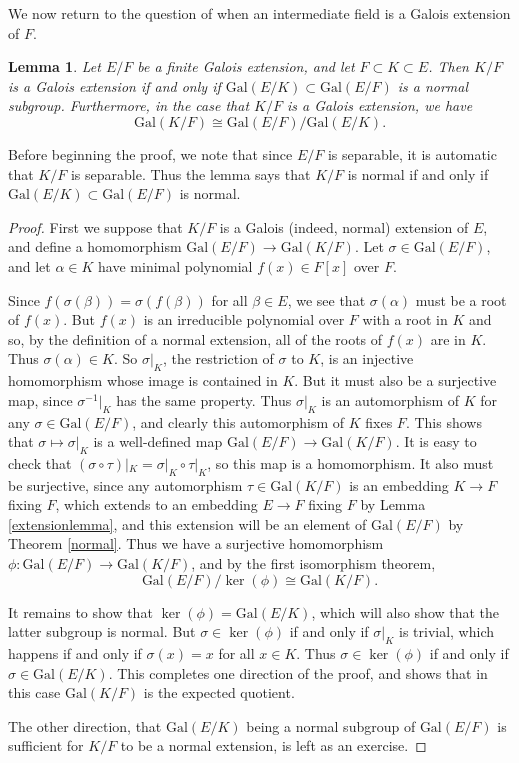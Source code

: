 \documentclass[12pt]{report}
\newtheorem{lemma}[thm]{Lemma}
\theoremstyle{definition}
\def\aa{\alpha}
\def\bb{\beta}
\def\Gal{\text{Gal}}
\begin{document}
We now return to the question of when an intermediate field is a Galois
extension of $F$.

\begin{lemma}
    Let $E/F$ be a finite Galois extension, and let $F \subset  K \subset  E$. Then $K/F$ is a Galois extension if and only if $\Gal(E/K) \subset  \Gal(E/F)$ is a normal subgroup. Furthermore, in the case that $K/F$ is a Galois extension, we have $$\Gal(K/F)\cong \Gal(E/F)/\Gal(E/K).$$
\end{lemma}

Before beginning the proof, we note that since $E/F$ is separable, it is automatic that $K/F$ is separable. Thus the lemma says that $K/F$ is normal if and only if $\Gal(E/K) \subset  \Gal(E/F)$ is normal.

\begin{proof}
    First we suppose that $K/F$ is a Galois (indeed, normal) extension of $E$, and define a homomorphism $\Gal(E/F) \to  \Gal(K/F)$. Let $\sigma\in \Gal(E/F)$, and let $\aa\in K$ have minimal polynomial $f(x)\in F[x]$ over $F$.

    Since $f(\sigma(\bb)) = \sigma(f(\bb))$ for all $\bb\in E$, we see that $\sigma(\aa)$ must be a root of $f(x)$. But $f(x)$ is an irreducible polynomial over $F$ with a root in $K$ and so, by the definition of a normal extension, all of the roots of $f(x)$ are in $K$. Thus $\sigma(\aa)\in K$. So $\sigma|_K$, the restriction of $\sigma$ to $K$, is an injective homomorphism whose image is contained in $K$. But it must also be a surjective map, since $\sigma^{-1}|_K$ has the same property. Thus $\sigma|_K$ is an automorphism of $K$ for any $\sigma\in \Gal(E/F)$, and clearly this automorphism of $K$ fixes $F$. This shows that $\sigma \mapsto \sigma|_K$ is a well-defined map $\Gal(E/F) \to  \Gal(K/F)$. It is easy to check that $(\sigma \circ \tau )|_K = \sigma|_K \circ \tau|_K$, so this map is a homomorphism. It also must be surjective, since any automorphism $\tau\in \Gal(K/F)$ is an embedding $K \to  F$ fixing $F$, which extends to an embedding $E \to  F$ fixing $F$ by Lemma \ref{extensionlemma}, and this extension will be an element of $\Gal(E/F)$ by Theorem \ref{normal}. Thus we have a surjective homomorphism $\phi: \Gal(E/F) \to  \Gal(K/F)$, and by the first isomorphism theorem,
    $$ \Gal(E/F)/\ker(\phi)\cong \Gal(K/F).$$

    It remains to show that $\ker(\phi) = \Gal(E/K)$, which will also show that the latter subgroup is normal. But $\sigma\in \ker(\phi)$ if and only if $\sigma|_K$ is trivial, which happens if and only if $\sigma(x) = x$ for all $x\in K$. Thus $\sigma\in \ker(\phi)$ if and only if $\sigma\in \Gal(E/K)$. This completes one direction of the proof, and shows that in this case $\Gal(K/F)$ is the expected quotient.

    The other direction, that $\Gal(E/K)$ being a normal subgroup of $\Gal(E/F)$ is sufficient for $K/F$ to be a normal extension, is left as an exercise.
\end{proof}
\end{document}
